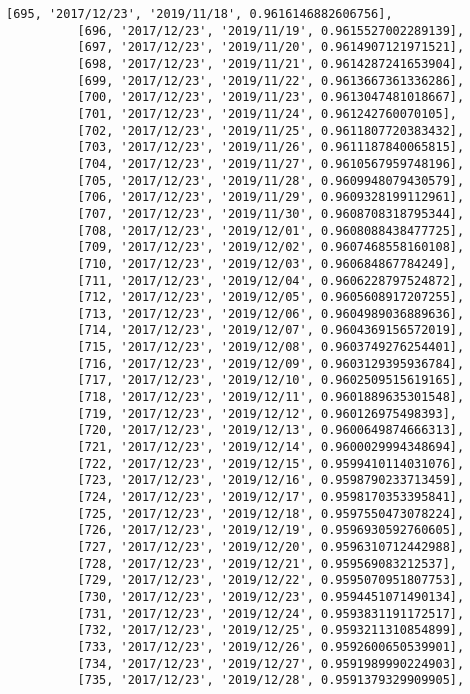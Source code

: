 \documentclass[11pt]{article}
\begin{document}
\begin{Verbatim}[commandchars=\\\{\}]
          [695, '2017/12/23', '2019/11/18', 0.9616146882606756],
          [696, '2017/12/23', '2019/11/19', 0.9615527002289139],
          [697, '2017/12/23', '2019/11/20', 0.9614907121971521],
          [698, '2017/12/23', '2019/11/21', 0.9614287241653904],
          [699, '2017/12/23', '2019/11/22', 0.9613667361336286],
          [700, '2017/12/23', '2019/11/23', 0.9613047481018667],
          [701, '2017/12/23', '2019/11/24', 0.961242760070105],
          [702, '2017/12/23', '2019/11/25', 0.9611807720383432],
          [703, '2017/12/23', '2019/11/26', 0.9611187840065815],
          [704, '2017/12/23', '2019/11/27', 0.9610567959748196],
          [705, '2017/12/23', '2019/11/28', 0.9609948079430579],
          [706, '2017/12/23', '2019/11/29', 0.9609328199112961],
          [707, '2017/12/23', '2019/11/30', 0.9608708318795344],
          [708, '2017/12/23', '2019/12/01', 0.9608088438477725],
          [709, '2017/12/23', '2019/12/02', 0.9607468558160108],
          [710, '2017/12/23', '2019/12/03', 0.960684867784249],
          [711, '2017/12/23', '2019/12/04', 0.9606228797524872],
          [712, '2017/12/23', '2019/12/05', 0.9605608917207255],
          [713, '2017/12/23', '2019/12/06', 0.9604989036889636],
          [714, '2017/12/23', '2019/12/07', 0.9604369156572019],
          [715, '2017/12/23', '2019/12/08', 0.9603749276254401],
          [716, '2017/12/23', '2019/12/09', 0.9603129395936784],
          [717, '2017/12/23', '2019/12/10', 0.9602509515619165],
          [718, '2017/12/23', '2019/12/11', 0.9601889635301548],
          [719, '2017/12/23', '2019/12/12', 0.960126975498393],
          [720, '2017/12/23', '2019/12/13', 0.9600649874666313],
          [721, '2017/12/23', '2019/12/14', 0.9600029994348694],
          [722, '2017/12/23', '2019/12/15', 0.9599410114031076],
          [723, '2017/12/23', '2019/12/16', 0.9598790233713459],
          [724, '2017/12/23', '2019/12/17', 0.9598170353395841],
          [725, '2017/12/23', '2019/12/18', 0.9597550473078224],
          [726, '2017/12/23', '2019/12/19', 0.9596930592760605],
          [727, '2017/12/23', '2019/12/20', 0.9596310712442988],
          [728, '2017/12/23', '2019/12/21', 0.959569083212537],
          [729, '2017/12/23', '2019/12/22', 0.9595070951807753],
          [730, '2017/12/23', '2019/12/23', 0.9594451071490134],
          [731, '2017/12/23', '2019/12/24', 0.9593831191172517],
          [732, '2017/12/23', '2019/12/25', 0.9593211310854899],
          [733, '2017/12/23', '2019/12/26', 0.9592600650539901],
          [734, '2017/12/23', '2019/12/27', 0.9591989990224903],
          [735, '2017/12/23', '2019/12/28', 0.9591379329909905],

\end{Verbatim}
\end{document}

